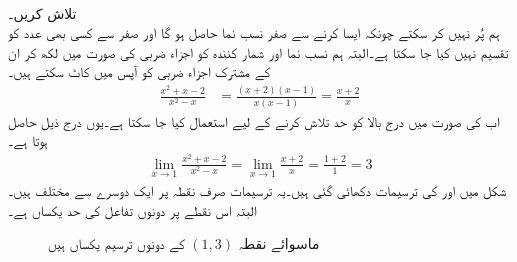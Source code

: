 \\
 تلاش کریں۔\\
ہم  پُر نہیں کر سکتے  چونکہ ایسا کرنے سے صفر نسب نما حاصل ہو گا اور صفر سے کسی بھی عدد کو تقسیم نہیں کیا جا سکتا ہے۔البتہ ہم نسب نما اور شمار کنندہ کو اجزاء ضربی کی صورت میں لکھ کر ان کے مشترک اجزاء ضربی  کو آپس میں کاٹ سکتے ہیں۔
\begin{align*}
\frac{x^2+x-2}{x^2-x}&=\frac{(x+2)(x-1)}{x(x-1)}=\frac{x+2}{x}
\end{align*}
اب  کی صورت میں  درج بالا کو حد تلاش کرنے کے لیے  استعمال کیا جا سکتا ہے۔یوں درج ذیل حاصل ہوتا ہے۔
\begin{align*}
\lim_{x \to 1} \frac{x^2+x-2}{x^2-x}=\lim_{x\to 1}\frac{x+2}{x}=\frac{1+2}{1}=3
\end{align*}
شکل  میں  اور  کی  ترسیمات  دکھائی گئی ہیں۔یہ ترسیمات  صرف نقطہ  پر ایک دوسرے سے مختلف ہیں۔البتہ اس نقطے  پر دونوں تفاعل کی حد یکساں ہے۔ 
%
\begin{figure}
\centering
\begin{subfigure}{0.5\textwidth}
\centering
{}
\caption{}
\end{subfigure}%
\begin{subfigure}{0.5\textwidth}
\centering
{}
\caption{}
\end{subfigure}%
\caption{ماسوائے نقطہ $(1,3)$ کے دونوں ترسیم یکساں ہیں}
\label{شکل_مثال_حد_اجزاء_منسوخ_الف}
\end{figure}

